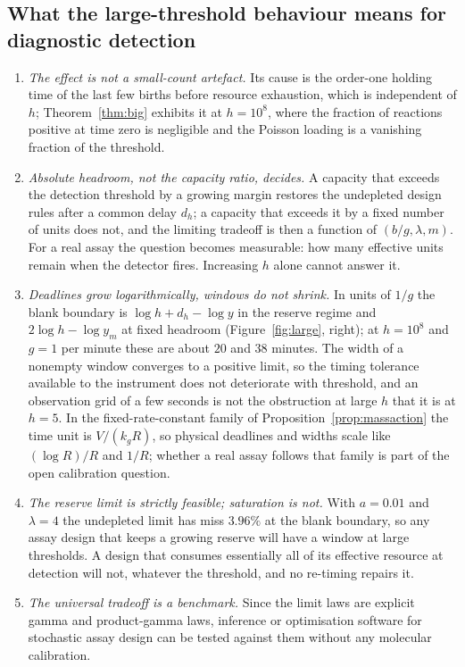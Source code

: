 \documentclass[11pt,a4paper]{article}
\theoremstyle{plain}
\theoremstyle{definition}
\theoremstyle{remark}
\begin{document}
\subsection{What the large-threshold behaviour means for diagnostic detection}\label{sec:meaning}
\begin{enumerate}[label=(\arabic*)]
\item \emph{The effect is not a small-count artefact.} Its cause is the order-one holding time of the last few births before resource exhaustion, which is independent of $h$; Theorem~\ref{thm:big} exhibits it at $h=10^{8}$, where the fraction of reactions positive at time zero is negligible and the Poisson loading is a vanishing fraction of the threshold.
\item \emph{Absolute headroom, not the capacity ratio, decides.} A capacity that exceeds the detection threshold by a growing margin restores the undepleted design rules after a common delay $d_h$; a capacity that exceeds it by a fixed number of units does not, and the limiting tradeoff is then a function of $(b/g,\lambda,m)$. For a real assay the question becomes measurable: how many effective units remain when the detector fires. Increasing $h$ alone cannot answer it.
\item \emph{Deadlines grow logarithmically, windows do not shrink.} In units of $1/g$ the blank boundary is $\log h+d_h-\log y$ in the reserve regime and $2\log h-\log y_m$ at fixed headroom (Figure~\ref{fig:large}, right); at $h=10^{8}$ and $g=1$ per minute these are about $20$ and $38$ minutes. The width of a nonempty window converges to a positive limit, so the timing tolerance available to the instrument does not deteriorate with threshold, and an observation grid of a few seconds is not the obstruction at large $h$ that it is at $h=5$. In the fixed-rate-constant family of Proposition~\ref{prop:massaction} the time unit is $V/(k_gR)$, so physical deadlines and widths scale like $(\log R)/R$ and $1/R$; whether a real assay follows that family is part of the open calibration question.
\item \emph{The reserve limit is strictly feasible; saturation is not.} With $a=0.01$ and $\lambda=4$ the undepleted limit has miss $3.96\%$ at the blank boundary, so any assay design that keeps a growing reserve will have a window at large thresholds. A design that consumes essentially all of its effective resource at detection will not, whatever the threshold, and no re-timing repairs it.
\item \emph{The universal tradeoff is a benchmark.} Since the limit laws are explicit gamma and product-gamma laws, inference or optimisation software for stochastic assay design can be tested against them without any molecular calibration.
\end{enumerate}
\end{document}
